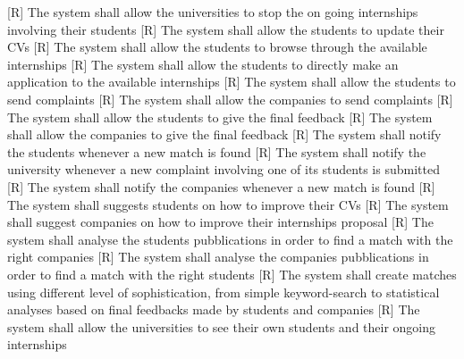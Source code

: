 \documentclass{article}
\begin{document}
[R\therequirement] The system shall allow the universities to stop the on going internships involving their students\newline
{}
[R\therequirement] The system shall allow the  students to update their CVs \newline
{}
[R\therequirement] The system shall allow the students to browse through the available internships \newline
{}
[R\therequirement] The system shall allow the students to directly make an application to the available internships \newline
{}
[R\therequirement] The system shall allow the students to send complaints \newline
{}
[R\therequirement] The system shall allow the companies to send complaints\newline
{}
[R\therequirement] The system shall allow the students to give the final feedback\newline
{}
[R\therequirement] The system shall allow the companies to give the final feedback\newline
{}
[R\therequirement] The system shall notify the students whenever a new match is found\newline
{}
[R\therequirement] The system shall notify the university whenever a new complaint involving one of its students is submitted\newline
{}
[R\therequirement] The system shall notify the companies whenever a new match is found\newline
{}
[R\therequirement] The system shall suggests students on how to improve their CVs\newline
{}
[R\therequirement] The system shall suggest companies on how to improve their internships proposal\newline
{}
[R\therequirement] The system shall analyse the students pubblications in order to find a match with the right companies \newline
{}
[R\therequirement] The system shall analyse the companies pubblications in order to find a match with the right students \newline
{}
[R\therequirement] The system shall create matches using different level of sophistication, from simple keyword-search to statistical analyses based on final feedbacks made by students and companies \newline
{}
[R\therequirement] The system shall allow the universities to see their own students and their ongoing internships\newline
\end{document}
